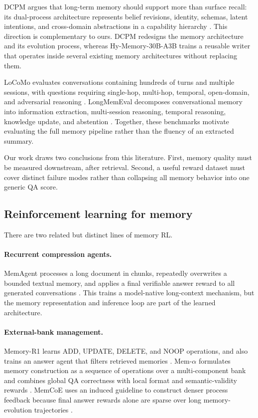 \documentclass{article}
\begin{document}
DCPM argues that long-term memory should support more than surface recall: its dual-process architecture represents belief revisions, identity, schemas, latent intentions, and cross-domain abstractions in a capability hierarchy \citep{dcpm}. This direction is complementary to ours. DCPM redesigns the memory architecture and its evolution process, whereas Hy-Memory-30B-A3B trains a reusable writer that operates inside several existing memory architectures without replacing them.

LoCoMo evaluates conversations containing hundreds of turns and multiple sessions, with questions requiring single-hop, multi-hop, temporal, open-domain, and adversarial reasoning \citep{locomo}. LongMemEval decomposes conversational memory into information extraction, multi-session reasoning, temporal reasoning, knowledge update, and abstention \citep{longmemeval}. Together, these benchmarks motivate evaluating the full memory pipeline rather than the fluency of an extracted summary.

Our work draws two conclusions from this literature. First, memory quality must be measured downstream, after retrieval. Second, a useful reward dataset must cover distinct failure modes rather than collapsing all memory behavior into one generic QA score.

\subsection{Reinforcement learning for memory}

There are two related but distinct lines of memory RL.

\paragraph{Recurrent compression agents.}
MemAgent processes a long document in chunks, repeatedly overwrites a bounded textual memory, and applies a final verifiable answer reward to all generated conversations \citep{memagent}. This trains a model-native long-context mechanism, but the memory representation and inference loop are part of the learned architecture.

\paragraph{External-bank management.}
Memory-R1 learns ADD, UPDATE, DELETE, and NOOP operations, and also trains an answer agent that filters retrieved memories \citep{memoryr1}. Mem-$\alpha$ formulates memory construction as a sequence of operations over a multi-component bank and combines global QA correctness with local format and semantic-validity rewards \citep{memalpha}. MemCoE uses an induced guideline to construct denser process feedback because final answer rewards alone are sparse over long memory-evolution trajectories \citep{memcoe}.
\end{document}
